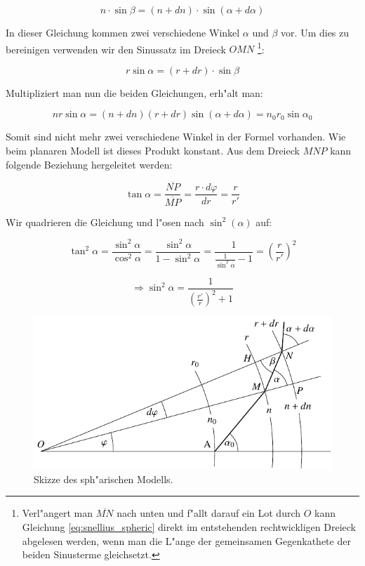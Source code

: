 \begin{refsection}
\begin{equation} \label{eq:snellius_spheric}
n \cdot \sin \beta = (n + dn) \cdot \sin(\alpha + d\alpha)
\end{equation}

In dieser Gleichung kommen zwei verschiedene Winkel $\alpha$ und $\beta$ vor. 
Um dies zu bereinigen verwenden wir den Sinussatz im Dreieck $OMN$
\footnote{Verl"angert man $\overline{MN}$ nach unten und f"allt darauf ein Lot durch $O$ kann Gleichung \ref{eq:snellius_spheric} direkt im entstehenden rechtwickligen Dreieck abgelesen werden, wenn man die L"ange der gemeinsamen Gegenkathete der beiden Sinusterme gleichsetzt.}:

\begin{equation} \label{eq:snellius_spheric2}
r \sin\alpha = (r + dr) \cdot \sin\beta
\end{equation}



Multipliziert man nun die beiden Gleichungen, erh"alt man:

\begin{equation} \label{eq:sphere_base}
n r \sin \alpha = (n + dn)(r + dr) \sin (\alpha + d\alpha) = n_0 r_0 \sin \alpha_0
\end{equation}

Somit sind nicht mehr zwei verschiedene Winkel in der Formel vorhanden.
Wie beim planaren Modell ist dieses Produkt konstant.  
Aus dem Dreieck $MNP$ kann folgende Beziehung hergeleitet werden:

$$\tan \alpha =  \frac{\overline{NP}}{\overline{MP}} = \frac{r \cdot d\varphi}{dr} = \frac{r}{r'}$$

Wir quadrieren die Gleichung und l"osen nach $\sin^2(\alpha)$ auf:

$$\tan^2 \alpha = \frac{\sin^2\alpha}{\cos^2\alpha} = \frac{\sin^2\alpha}{1-\sin^2\alpha} = \frac{1}{\displaystyle\frac{1}{\sin^2\alpha}-1} = \left( \frac{r}{r'} \right)^2$$

\begin{equation} \label{eq:sphere_sine}
\Rightarrow \sin^2\alpha = \frac{1}{\left( \frac{r'}{r} \right)^2 +1}
\end{equation}

\begin{figure} 
\centering
\includegraphics[scale=1]{licht/standalone/fig_sphere_skizze.pdf}
\caption{Skizze des sph"arischen Modells. \label{fig:sphere_skizze}}
\end{figure}


\end{refsection}
